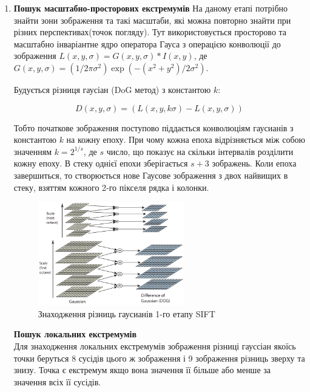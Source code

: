 \begin{enumerate}
    \item \textbf{Пошук масштабно-просторових екстремумів}
          На даному етапі потрібно знайти зони зображення та такі масштаби, які можна повторно
          знайти при різних перспективах(точок погляду). Тут використовується просторово та
          масштабно інваріантне ядро оператора Гауса з операцією конволюції
          до зображення $L(x,y,\sigma) = G(x,y,\sigma) \ast I(x,y)$,
          де $G(x,y,\sigma) = (1/2\pi\sigma^2)\exp({-(x^2+y^2)/2\sigma^2})$.


          Будується різниця гаусіан (DoG метод) з константою $k$:

          \begin{equation}
              D(x,y,\sigma) = (L(x,y,k\sigma) - L(x,y,\sigma))
          \end{equation}

          Тобто початкове зображення поступово піддається конволюціям гаусианів з константою
          $k$ на кожну епоху. При чому кожна епоха відрізняється між собою значенням $k = 2^{1/s}$,
          де $s$ число, що показує на скільки інтервалів розділити кожну епоху.
          В стеку однієї епохи зберігається $s+3$ зображень. Коли епоха завершиться, то
          створюється нове Гаусове зображення з двох найвищих в стеку,
          взяттям кожного 2-го пікселя рядка і колонки.

          \begin{figure}[H]
              \centering
              \includegraphics[width=0.6\textwidth]{images/sift1}
              \caption{Знаходження різниць гаусианів 1-го етапу SIFT}
              \label{fig:swift1}
          \end{figure}

          \subitem \textbf{Пошук локальних екстремумів} \\
          Для знаходження локальних екстремумів зображення різниці гауссіан
          якоїсь точки беруться 8 сусідів цього ж зображення і 9 зображення різниць
          зверху та знизу. Точка є екстремум якщо вона значення її більше або менше за
          значення всіх її сусідів.


\end{enumerate}
